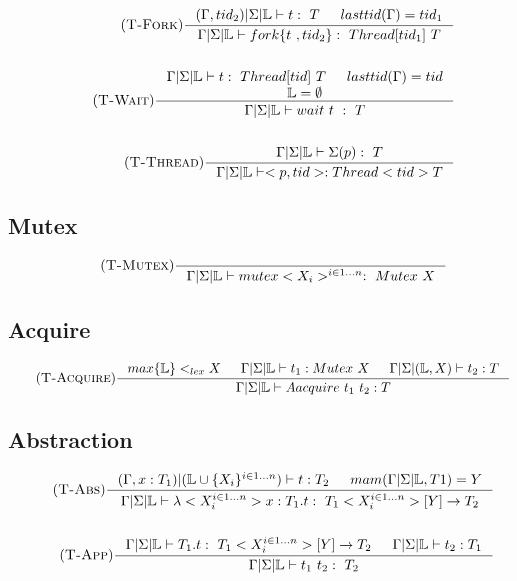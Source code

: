 \documentclass[12pt]{article}
\def\lock {\mathbb{L}}
\begin{document}
\begin{align*}
    \tag {\textsc{T-Fork}}
    \inference[]{(\Gamma,tid_2)|\Sigma|\lock\vdash t:~T & lasttid(\Gamma) = tid_1}{ \Gamma|\Sigma|\lock\vdash fork \{t~,tid_2\} :~Thread[tid_1]~T} 
    \\
    \\
    \tag {\textsc{T-Wait}}
    \inference[]{\Gamma|\Sigma|\lock\vdash t:~Thread[tid]~T & lasttid(\Gamma) = tid\\\lock = \emptyset}{ \Gamma|\Sigma|\lock\vdash wait ~t~ :~T}
    \\
    \\
    \tag {\textsc{T-Thread}}
    \inference[]{\Gamma|\Sigma|\lock\vdash \Sigma(p):~T}{\Gamma|\Sigma|\lock\vdash <p,tid>:Thread<tid> T}
\end{align*}

\subsection{Mutex}
\begin{align*}
    \tag {\textsc{T-Mutex}}
    \inference[]{
        }{\Gamma|\Sigma|\lock \vdash mutex<X_i>^{i\in 1...n} :~Mutex~X}
\end{align*}

\subsection{Acquire}
\begin{align*}
\tag{\textsc{T-Acquire}}
\inference[]{max\{\lock\}<_{lex}X & \Gamma|\Sigma|\lock \vdash t_1:Mutex~X 
& \Gamma|\Sigma|(\lock,X) \vdash t_2:T}{\Gamma|\Sigma|\lock \vdash Aacquire~t_1~t_2:T}
\end{align*}

\subsection{Abstraction}
\begin{align*}
\tag {\textsc{T-Abs}}
\inference[]{
    (\Gamma,x:T_1)|(\lock\cup\{X_i\}^{i\in 1...n}) \vdash t:T_2 & mam(\Gamma|\Sigma|\lock,T1) = Y
    }{\Gamma|\Sigma|\lock \vdash \lambda<X_i^{i\in 1...n}> x:T_1.t :~T_1<X_i^{i\in 1...n}>[Y]\rightarrow T_2}
    \\
    \\
    \tag {\textsc{T-App}}
\inference[]{
    \Gamma|\Sigma|\lock \vdash T_1.t :~T_1<X_i^{i\in 1...n}>[Y]\rightarrow T_2 & \Gamma|\Sigma|\lock \vdash t_2:T_1 
    }{\Gamma|\Sigma|\lock \vdash t_1\ t_2:~T_2}
\end{align*}
\end{document}
